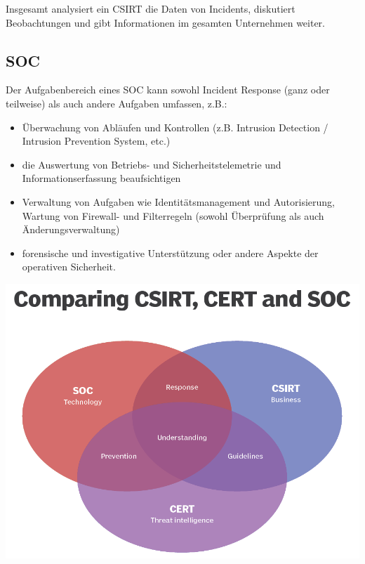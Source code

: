 Insgesamt analysiert ein CSIRT die Daten von Incidents, diskutiert Beobachtungen und gibt Informationen im gesamten Unternehmen weiter.


\subsection{SOC}
Der Aufgabenbereich eines SOC kann sowohl Incident Response (ganz oder teilweise) als auch andere Aufgaben umfassen, z.B.:

\begin{itemize}
    \item Überwachung von Abläufen und Kontrollen (z.B. Intrusion Detection / Intrusion Prevention System, etc.)
    \item die Auswertung von Betriebs- und Sicherheitstelemetrie und Informationserfassung beaufsichtigen
    \item Verwaltung von Aufgaben wie Identitätsmanagement und Autorisierung, Wartung von Firewall- und Filterregeln (sowohl Überprüfung als auch Änderungsverwaltung)
    \item forensische und investigative Unterstützung oder andere Aspekte der operativen Sicherheit.
\end{itemize}

\begin{center}
    \vspace{-8pt}
    \includegraphics[width=0.8\linewidth]{./img/02-begriffe/soc_cert_csirt}
    \vspace{-8pt}
\end{center}

